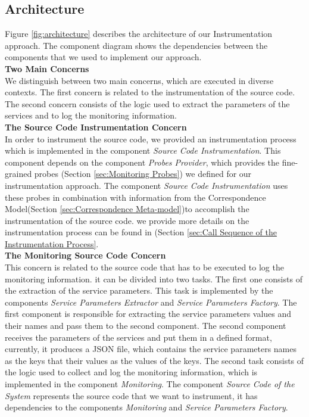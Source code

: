 \subsection{Architecture}
\label{sec:architecture}
Figure \ref{fig:architecture} describes the architecture of our Instrumentation approach. The component diagram shows the dependencies between the components that we used to implement our approach.\\ 

\textbf{Two Main Concerns}\\
We distinguish between two main concerns, which are executed in diverse contexts. The first concern is related to the instrumentation of the source code. The second concern consists of the logic used to extract the parameters of the services and to log the monitoring information. \\ 

\textbf{The Source Code Instrumentation Concern}\\
In order to instrument the source code, we provided an instrumentation process which is implemented in the component \textit{Source Code Instrumentation}. This component depends on the component \textit{Probes Provider}, which provides the fine-grained probes (Section \ref{sec:Monitoring Probes}) we defined for our instrumentation approach. The component \textit{Source Code Instrumentation} uses these probes in combination with information from the Correspondence Model(Section \ref{sec:Correspondence Meta-model})to accomplish the instrumentation of the source code. we provide more details on the instrumentation process can be found in (Section \ref{sec:Call Sequence of the Instrumentation Process}.\\


\textbf{The Monitoring Source Code Concern}\\
This concern is related to the source code that has to be executed to log the monitoring information. it can be divided into two tasks. The first one consists of the extraction of the service parameters. This task is implemented by the components \textit{Service Parameters Extractor} and \textit{Service Parameters Factory}. The first component is responsible for extracting the service parameters values and their names and pass them to the second component. The second component receives the parameters of the services and put them in a defined format, currently, it produces a JSON file, which contains the service parameters names as the keys that their values as the values of the keys. The second task consists of the logic used to collect and log the monitoring information, which is implemented in the component \textit{Monitoring}. The component \textit{Source Code of the System} represents the source code that we want to instrument, it has dependencies to the components \textit{Monitoring} and \textit{Service Parameters Factory}.

